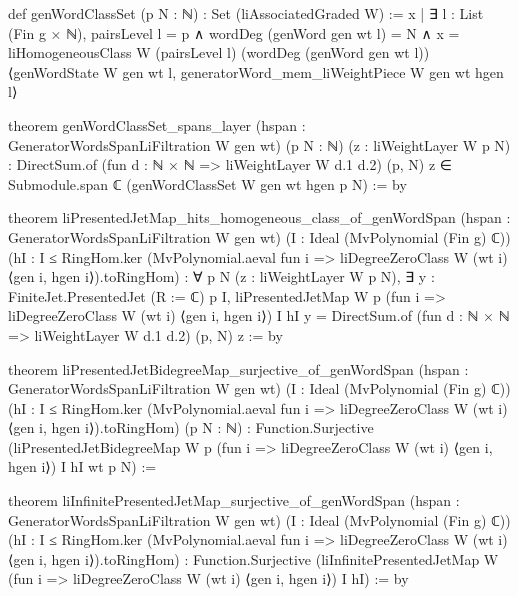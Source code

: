 \begin{leancode}
def genWordClassSet (p N : ℕ) : Set (liAssociatedGraded W) :=
  {x | ∃ l : List (Fin g × ℕ),
      pairsLevel l = p ∧ wordDeg (genWord gen wt l) = N ∧
      x = liHomogeneousClass W (pairsLevel l) (wordDeg (genWord gen wt l))
        ⟨genWordState W gen wt l, generatorWord_mem_liWeightPiece W gen wt hgen l⟩}

theorem genWordClassSet_spans_layer (hspan : GeneratorWordsSpanLiFiltration W gen wt)
    (p N : ℕ) (z : liWeightLayer W p N) :
    DirectSum.of (fun d : ℕ × ℕ => liWeightLayer W d.1 d.2) (p, N) z ∈
      Submodule.span ℂ (genWordClassSet W gen wt hgen p N) := by

theorem liPresentedJetMap_hits_homogeneous_class_of_genWordSpan
    (hspan : GeneratorWordsSpanLiFiltration W gen wt)
    (I : Ideal (MvPolynomial (Fin g) ℂ))
    (hI : I ≤ RingHom.ker
      (MvPolynomial.aeval fun i => liDegreeZeroClass W (wt i) ⟨gen i, hgen i⟩).toRingHom) :
    ∀ p N (z : liWeightLayer W p N),
      ∃ y : FiniteJet.PresentedJet (R := ℂ) p I,
        liPresentedJetMap W p (fun i => liDegreeZeroClass W (wt i) ⟨gen i, hgen i⟩) I hI y =
          DirectSum.of (fun d : ℕ × ℕ => liWeightLayer W d.1 d.2) (p, N) z := by

theorem liPresentedJetBidegreeMap_surjective_of_genWordSpan
    (hspan : GeneratorWordsSpanLiFiltration W gen wt)
    (I : Ideal (MvPolynomial (Fin g) ℂ))
    (hI : I ≤ RingHom.ker
      (MvPolynomial.aeval fun i => liDegreeZeroClass W (wt i) ⟨gen i, hgen i⟩).toRingHom)
    (p N : ℕ) :
    Function.Surjective
      (liPresentedJetBidegreeMap W p (fun i => liDegreeZeroClass W (wt i) ⟨gen i, hgen i⟩)
        I hI wt p N) :=

theorem liInfinitePresentedJetMap_surjective_of_genWordSpan
    (hspan : GeneratorWordsSpanLiFiltration W gen wt)
    (I : Ideal (MvPolynomial (Fin g) ℂ))
    (hI : I ≤ RingHom.ker
      (MvPolynomial.aeval fun i => liDegreeZeroClass W (wt i) ⟨gen i, hgen i⟩).toRingHom) :
    Function.Surjective
      (liInfinitePresentedJetMap W (fun i => liDegreeZeroClass W (wt i) ⟨gen i, hgen i⟩) I hI) := by
\end{leancode}

